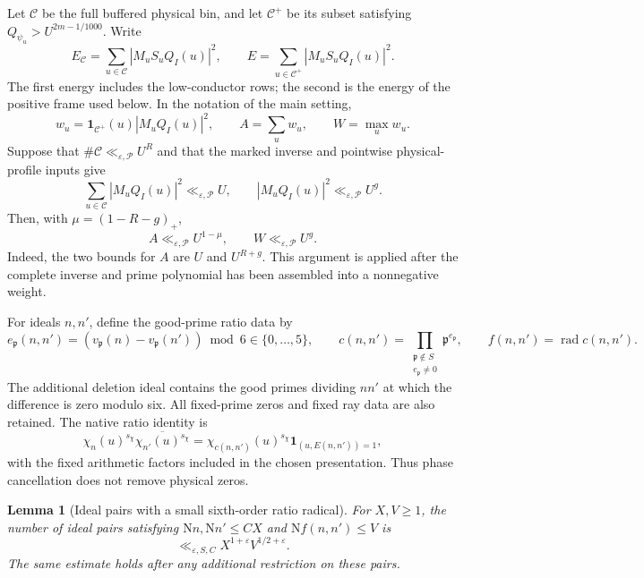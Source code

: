 \documentclass[11pt]{article}
\newtheorem{lemma}[theorem]{Lemma}
\theoremstyle{definition}
\newcommand{\N}{\mathrm N}
\newcommand{\eps}{\varepsilon}
\newcommand{\Cplus}{\mathcal C^+}
\newcommand{\lls}{\ll_{\eps,\mathcal P}}
\begin{document}
Let \(\mathcal C\) be the full buffered physical bin, and let
\(\Cplus\) be its subset satisfying
\(Q_{\psi_u}>U^{2m-1/1000}\).  Write
\[
 E_{\mathcal C}=\sum_{u\in\mathcal C}|M_uS_uQ_I(u)|^2,\qquad
 E=\sum_{u\in\Cplus}|M_uS_uQ_I(u)|^2.
\]
The first energy includes the low-conductor rows; the second is the
energy of the positive frame used below.  In the notation of the main
setting,
\[
 w_u=\mathbf1_{\Cplus}(u)|M_uQ_I(u)|^2,\qquad
 A=\sum_uw_u,\qquad W=\max_uw_u.
\]
Suppose that \(\#\mathcal C\lls U^R\) and that the marked inverse and
pointwise physical-profile inputs give
\[
 \sum_{u\in\mathcal C}|M_uQ_I(u)|^2\lls U,\qquad
 |M_uQ_I(u)|^2\lls U^g.
\]
Then, with \(\mu=(1-R-g)_+\),
\begin{equation}\label{early-eq-mass}
 A\lls U^{1-\mu},\qquad W\lls U^g.
\end{equation}
Indeed, the two bounds for \(A\) are \(U\) and \(U^{R+g}\).
This argument is applied after the complete inverse and prime polynomial
has been assembled into a nonnegative weight.

For ideals \(n,n'\), define the good-prime ratio data by
\[
 e_{\mathfrak p}(n,n')
   =(v_{\mathfrak p}(n)-v_{\mathfrak p}(n'))\bmod6
       \in\{0,\ldots,5\},\qquad
 c(n,n')=\prod_{\substack{\mathfrak p\notin S\\e_{\mathfrak p}\ne0}}
                 \mathfrak p^{e_{\mathfrak p}},\qquad
 f(n,n')=\operatorname{rad}c(n,n').
\]
The additional deletion ideal contains the good primes dividing \(nn'\)
at which the difference is zero modulo six.  All fixed-prime zeros and
fixed ray data are also retained.  The native ratio identity is
\begin{equation}\label{early-eq-column-ratio}
 \chi_n(u)^{s_\chi}\overline{\chi_{n'}(u)^{s_\chi}}
  =\chi_{c(n,n')}(u)^{s_\chi}
       \mathbf1_{(u,E(n,n'))=1},
\end{equation}
with the fixed arithmetic factors included in the chosen presentation.
Thus phase cancellation does not remove physical zeros.

\begin{lemma}[Ideal pairs with a small sixth-order ratio radical]
\label{early-lem-pairs}
For \(X,V\ge1\), the number of ideal pairs satisfying
\(\N n,\N n'\le C X\) and \(\N f(n,n')\le V\) is
\[
 \ll_{\eps,S,C} X^{1+\eps}V^{1/2+\eps}.
\]
The same estimate holds after any additional restriction on these pairs.
\end{lemma}
\end{document}
